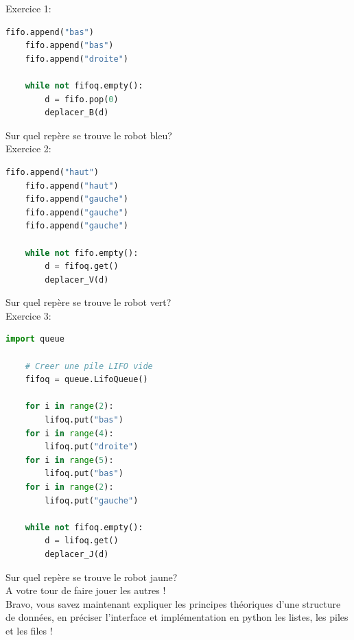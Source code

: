 Exercice 1:
\begin{lstlisting}[language=Python]
    fifo.append("bas")
    fifo.append("bas")
    fifo.append("droite")

    while not fifoq.empty():
        d = fifo.pop(0)
        deplacer_B(d)

\end{lstlisting}
Sur quel repère se trouve le robot bleu?\\

Exercice 2:
\begin{lstlisting}[language=Python]
    fifo.append("haut")
    fifo.append("haut")
    fifo.append("gauche")
    fifo.append("gauche")
    fifo.append("gauche")

    while not fifo.empty():
        d = fifoq.get()
        deplacer_V(d)
\end{lstlisting}
Sur quel repère se trouve le robot vert?\\

Exercice 3:
\begin{lstlisting}[language=Python]
    import queue 

    # Creer une pile LIFO vide 
    fifoq = queue.LifoQueue()

    for i in range(2):
        lifoq.put("bas")
    for i in range(4):
        lifoq.put("droite")
    for i in range(5):
        lifoq.put("bas")
    for i in range(2):
        lifoq.put("gauche")

    while not fifoq.empty():
        d = lifoq.get()
        deplacer_J(d)
\end{lstlisting}
Sur quel repère se trouve le robot jaune?\\

A votre tour de faire jouer les autres !\\




Bravo, vous savez maintenant expliquer les principes théoriques d'une structure de données, en préciser l'interface et implémentation en python les listes, les piles et les files ! 
